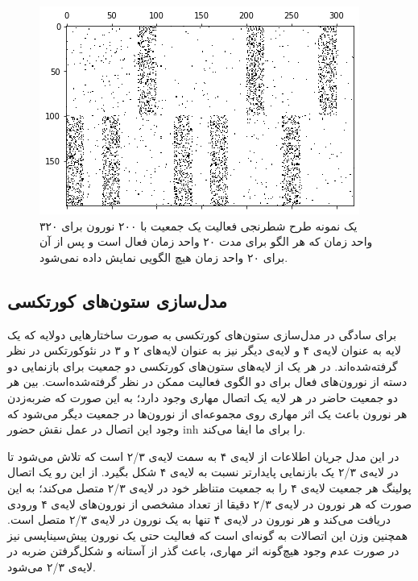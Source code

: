 \documentclass[12pt]{report}
\begin{document}
\begin{figure}[H]
	\centering
	\includegraphics[width=1.0\linewidth]{input-range.png}
	\caption[NS]{
		یک نمونه طرح شطرنجی فعالیت یک جمعیت با ۲۰۰ نورون برای ۳۲۰ واحد زمان که هر الگو برای مدت ۲۰ واحد زمان فعال است و پس از آن برای ۲۰ واحد زمان هیچ الگویی نمایش داده نمی‌شود.
	}
	\label{fig:input-range} 
\end{figure}
	
	\subsection{مدل‌سازی ستون‌های کورتکسی}
	
	برای سادگی در مدل‌سازی ستون‌های کورتکسی به صورت ساختارهایی دو‌لایه که یک لایه به عنوان لایه‌ی ۴ و لایه‌ی دیگر نیز به عنوان لایه‌‌های ۲ و ۳ در نئوکورتکس در نظر گرفته‌شده‌اند. در هر یک از لایه‌های ستون‌های کورتکسی دو جمعیت برای بازنمایی دو دسته‌ از نورون‌های فعال برای دو الگوی فعالیت ممکن در نظر گرفته‌شده‌است. بین هر دو جمعیت حاضر در هر لایه یک اتصال مهاری وجود دارد؛ به این صورت که ضربه‌زدن هر نورون باعث یک اثر مهاری روی مجموعه‌ای از نورون‌ها در جمعیت دیگر می‌شود که وجود این اتصال در عمل نقش حضور \gls{inh} را برای ما ایفا می‌کند.
	
	در این مدل جریان اطلاعات از لایه‌ی ۴ به سمت لایه‌ی‌ ۲/۳ است که تلاش می‌شود تا در لایه‌ی ۲/۳ یک بازنمایی پایدار‌تر نسبت به لایه‌ی ۴ شکل بگیرد. از این رو یک اتصال پولینگ هر جمعیت لایه‌ی ۴ را به جمعیت متناظر خود در لایه‌ی ۲/۳ متصل می‌کند؛ به این صورت که هر نورون در لایه‌ی ۲/۳ دقیقا از تعداد مشخصی از نورون‌های لایه‌ی ۴ ورودی دریافت می‌کند و هر نورون در لایه‌ی ۴ تنها به یک نورون در لایه‌ی ۲/۳ متصل است. همچنین وزن این اتصالات به گونه‌ای است که فعالیت حتی یک نورون پیش‌سیناپسی نیز در صورت عدم وجود هیچ‌گونه اثر مهاری، باعث گذر از آستانه و شکل‌گرفتن ضربه در لایه‌ی ۲/۳ می‌شود. 
	
\end{document}
